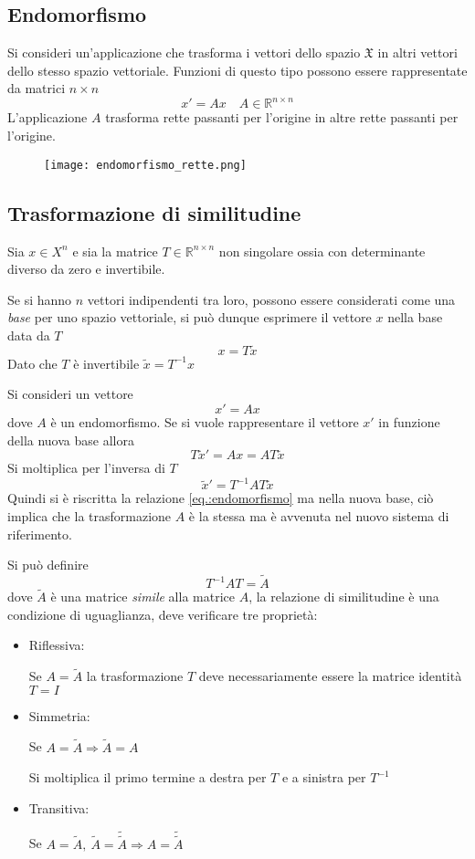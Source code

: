 \subsection{Endomorfismo}
Si consideri un'applicazione che trasforma i vettori dello spazio
$\mathfrak{X}$ in altri vettori dello stesso spazio vettoriale.
Funzioni di questo tipo possono essere rappresentate da matrici $n\times n$
$$
x' = Ax\quad A\in\mathbb{R}^{n\times n}
$$
L'applicazione $A$ trasforma rette passanti per l'origine in altre rette
passanti per l'origine.
\begin{figure}[h]
 \centering
 \texttt{[image: endomorfismo\_rette.png]}
 \label{Fig.:endomorfismo_rette}
\end{figure}

\subsection{Trasformazione di similitudine}
Sia $x\in X^n$ e sia la matrice $T \in \mathbb{R}^{n\times n}$ non singolare
ossia con determinante diverso da zero e invertibile.

Se si hanno $n$ vettori indipendenti tra loro, possono essere considerati come
una \textit{base} per uno spazio vettoriale, si può dunque esprimere il vettore
$x$ nella base data da $T$
$$
x = T \tilde{x}
$$
Dato che $T$ è invertibile
$\tilde{x} = T^{-1}x$

Si consideri un vettore
\begin{equation}x' = Ax\label{eq.:endomorfismo}\end{equation}
dove $A$ è un endomorfismo. Se si vuole
rappresentare il vettore $x'$ in funzione della nuova base allora
$$
T\tilde{x}' = Ax = AT\tilde{x}
$$
Si moltiplica per l'inversa di $T$
$$
\tilde{x}' = T^{-1}AT \tilde{x}
$$
Quindi si è riscritta la relazione \ref{eq.:endomorfismo} ma nella nuova base,
ciò implica che la trasformazione $A$ è la stessa ma è avvenuta nel nuovo
sistema di riferimento.

Si può definire
$$
T^{-1}A T = \tilde{A}
$$
dove $\tilde{A}$ è una matrice \textit{simile} alla matrice $A$, la relazione
di similitudine è una condizione di uguaglianza, deve verificare tre proprietà:
\begin{itemize}
 \item Riflessiva:

    Se $A=\tilde{A}$ la trasformazione $T$ deve necessariamente essere la
matrice identità $T=I$
 \item Simmetria:

 Se $A=\tilde{A} \Rightarrow \tilde{A}=A$

 Si moltiplica il primo termine a destra per $T$ e a sinistra per $T^{-1}$
 \item Transitiva:

 Se $A=\tilde{A},\ \tilde{A}=\tilde{\tilde{A}} \Rightarrow A =
\tilde{\tilde{A}}$
\end{itemize}


